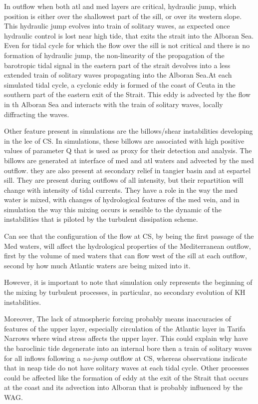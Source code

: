 In outflow when both atl and med layers are critical, hydraulic jump, which position is either over the shallowest part of the sill, or over its western slope. This hydraulic jump evolves into train of solitary waves, as expected once hydraulic control is lost near high tide, that exits the strait into the Alboran Sea. Even for tidal cycle for which the flow over the sill is not critical and there is no formation of hydraulic jump, the non-linearity of the propagation of the barotropic tidal signal in the eastern part of the strait devolves into a less extended train of solitary waves propagating into the Alboran Sea.At each simulated tidal cycle, a cyclonic eddy is formed of the coast of Ceuta in the southern part of the eastern exit of the Strait. This eddy is advected by the flow in th Alboran Sea and interacts with the train of solitary waves, locally diffracting the waves.


Other feature present in simulations are the billows/shear instabilities developing in the lee of CS. In simulations, these billows are associated with high positive values of parameter Q that is used as proxy for their detection and analysis. The billows are generated at interface of med and atl waters and advected by the med outflow.   they are also present at secondary relief in tangier basin and at espartel sill. They are present during outflows of all intensity, but their repartition will change with intensity of tidal currents. They have a role in the way the med water is mixed, with changes of hydrological features of the med vein, and in simulation the way this mixing occurs is sensible to the dynamic of the instabilities that is piloted by the turbulent dissipation scheme.


 Can see that the configuration of the flow at CS, by being the first passage of the Med waters, will affect the hydrological properties of the Mediterranean outflow, first by the volume of med waters that can flow west of the sill at each outflow, second by how much Atlantic waters are being mixed into it.

However, it is important to note that simulation only represents the beginning of the mixing by turbulent processes, in particular, no secondary evolution of KH instabilities.


Moreover, The lack of atmospheric forcing probably means inaccuracies of features of the upper layer, especially circulation of the Atlantic layer in Tarifa Narrows where wind stress affects the upper layer. This could explain why have the baroclinic tide degenerate into an internal bore then a train of solitary waves for all inflows following a \textit{no-jump} outflow at CS, whereas observations indicate that in neap tide do not have solitary waves at each tidal cycle. Other processes could be affected like the formation of eddy at the exit of the Strait that occurs at the coast and its advection into Alboran that is probably influenced by the WAG.
